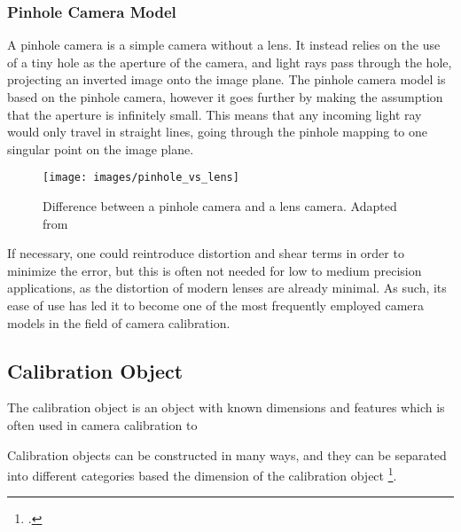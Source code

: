 \subsubsection{Pinhole Camera Model}

A pinhole camera is a simple camera without a lens. It instead relies on the use of a tiny hole as the aperture of the camera, and light rays pass through the hole, projecting an inverted image onto the image plane. The pinhole camera model is based on the pinhole camera, however it goes further by making the assumption that the aperture is infinitely small. This means that any incoming light ray would only travel in straight lines, going through the pinhole mapping to one singular point on the image plane. 

\begin{figure}[H]
    \centering
    \texttt{[image: images/pinhole\_vs\_lens]}
    \caption{Difference between a pinhole camera and a lens camera. Adapted from \cite{leCameraModel2018}}
\end{figure}

If necessary, one could reintroduce distortion and shear terms in order to minimize the error, but this is often not needed for low to medium precision applications, as the distortion of modern lenses are already minimal. As such, its ease of use has led it to become one of the most frequently employed camera models in the field of camera calibration. 

\subsection{Calibration Object}

The calibration object is an object with known dimensions and features which is often used in camera calibration to 


Calibration objects can be constructed in many ways, and they can be separated into different categories based the dimension of the calibration object \footcite{zhangCameraCalibration2007}.

